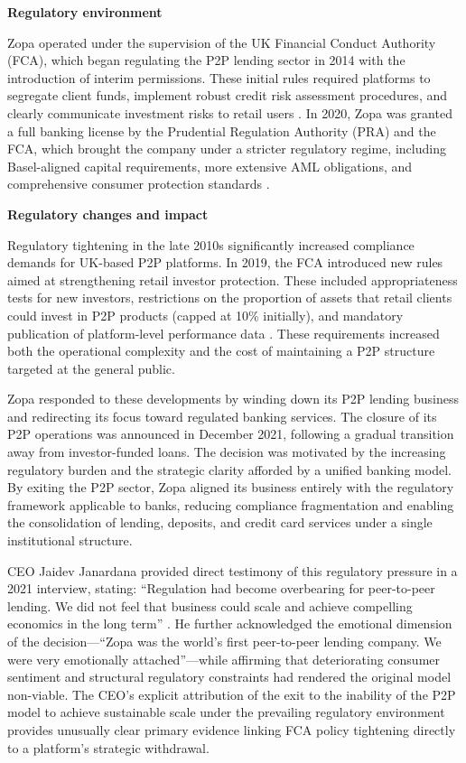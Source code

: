 \documentclass[pdflatex,sn-apa]{sn-jnl}%
\theoremstyle{thmstyleone}%
\theoremstyle{thmstyletwo}%
\theoremstyle{thmstylethree}%
\begin{document}
\textbf{Regulatory environment}

Zopa operated under the supervision of the UK Financial Conduct Authority (FCA), which began regulating the P2P lending sector in 2014 with the introduction of interim permissions. These initial rules required platforms to segregate client funds, implement robust credit risk assessment procedures, and clearly communicate investment risks to retail users \citep{fca_fca_2019}. In 2020, Zopa was granted a full banking license by the Prudential Regulation Authority (PRA) and the FCA, which brought the company under a stricter regulatory regime, including Basel-aligned capital requirements, more extensive AML obligations, and comprehensive consumer protection standards \citep{finextra_p2p_2016,zopa_bank_limited_about_nodate}.

\textbf{Regulatory changes and impact}

Regulatory tightening in the late 2010s significantly increased compliance demands for UK-based P2P platforms. In 2019, the FCA introduced new rules aimed at strengthening retail investor protection. These included appropriateness tests for new investors, restrictions on the proportion of assets that retail clients could invest in P2P products (capped at 10\% initially), and mandatory publication of platform-level performance data \citep{fca_ps1914_2018}. These requirements increased both the operational complexity and the cost of maintaining a P2P structure targeted at the general public.

Zopa responded to these developments by winding down its P2P lending business and redirecting its focus toward regulated banking services. The closure of its P2P operations was announced in December 2021, following a gradual transition away from investor-funded loans. The decision was motivated by the increasing regulatory burden and the strategic clarity afforded by a unified banking model. By exiting the P2P sector, Zopa aligned its business entirely with the regulatory framework applicable to banks, reducing compliance fragmentation and enabling the consolidation of lending, deposits, and credit card services under a single institutional structure.

\textcolor{NavyBlue}{CEO Jaidev Janardana provided direct testimony of this regulatory pressure in a 2021 interview, stating: ``Regulation had become overbearing for peer-to-peer lending. We did not feel that business could scale and achieve compelling economics in the long term'' \citep{janardana_zopa_2021}. He further acknowledged the emotional dimension of the decision---``Zopa was the world's first peer-to-peer lending company. We were very emotionally attached''---while affirming that deteriorating consumer sentiment and structural regulatory constraints had rendered the original model non-viable. The CEO's explicit attribution of the exit to the inability of the P2P model to achieve sustainable scale under the prevailing regulatory environment provides unusually clear primary evidence linking FCA policy tightening directly to a platform's strategic withdrawal.}
\end{document}

